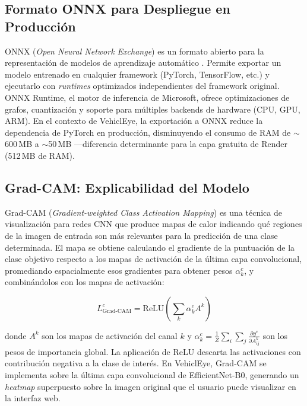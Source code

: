 \documentclass[12pt,a4paper]{article}
\begin{document}
\subsection{Formato ONNX para Despliegue en Producción}

ONNX (\textit{Open Neural Network Exchange}) es un formato abierto para la representación de modelos de aprendizaje automático \cite{onnxdocs}. Permite exportar un modelo entrenado en cualquier framework (PyTorch, TensorFlow, etc.) y ejecutarlo con \textit{runtimes} optimizados independientes del framework original. ONNX Runtime, el motor de inferencia de Microsoft, ofrece optimizaciones de grafos, cuantización y soporte para múltiples backends de hardware (CPU, GPU, ARM). En el contexto de VehiclEye, la exportación a ONNX reduce la dependencia de PyTorch en producción, disminuyendo el consumo de RAM de $\sim$600\,MB a $\sim$50\,MB —diferencia determinante para la capa gratuita de Render (512\,MB de RAM).

\subsection{Grad-CAM: Explicabilidad del Modelo}

Grad-CAM (\textit{Gradient-weighted Class Activation Mapping}) \cite{selvaraju2017grad} es una técnica de visualización para redes CNN que produce mapas de calor indicando qué regiones de la imagen de entrada son más relevantes para la predicción de una clase determinada. El mapa se obtiene calculando el gradiente de la puntuación de la clase objetivo respecto a los mapas de activación de la última capa convolucional, promediando espacialmente esos gradientes para obtener pesos $\alpha_k^c$, y combinándolos con los mapas de activación:

\begin{equation}
    L^c_{\text{Grad-CAM}} = \text{ReLU}\!\left(\sum_k \alpha_k^c A^k\right)
\end{equation}

donde $A^k$ son los mapas de activación del canal $k$ y $\alpha_k^c = \frac{1}{Z} \sum_i \sum_j \frac{\partial y^c}{\partial A^k_{ij}}$ son los pesos de importancia global. La aplicación de ReLU descarta las activaciones con contribución negativa a la clase de interés. En VehiclEye, Grad-CAM se implementa sobre la última capa convolucional de EfficientNet-B0, generando un \textit{heatmap} superpuesto sobre la imagen original que el usuario puede visualizar en la interfaz web.

\end{document}
